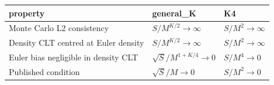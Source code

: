 \begin{tabular}{lll}
\toprule
property & general_K & K4 \\
\midrule
Monte Carlo L2 consistency & $S/M^{K/2}\to\infty$ & $S/M^2\to\infty$ \\
Density CLT centred at Euler density & $S/M^{K/2}\to\infty$ & $S/M^2\to\infty$ \\
Euler bias negligible in density CLT & $\sqrt{S}/M^{1+K/4}\to0$ & $S/M^4\to0$ \\
Published condition & $\sqrt{S}/M\to0$ & $S/M^2\to0$ \\
\bottomrule
\end{tabular}
